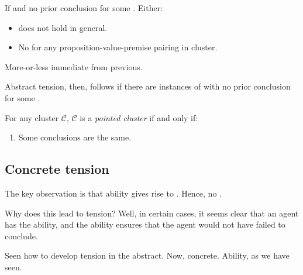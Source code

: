 \begin{note}
  \begin{proposition}
    If \ragCluster{} and no prior conclusion for some \jag{}.
    Either:
    \begin{itemize}
    \item
      \ESU{} does not hold in general.
    \item
      No \csVImp{} for any proposition-value-premise pairing in cluster.
    \end{itemize}
      \begin{argument}
    More-or-less immediate from previous.
  \end{argument}
  \end{proposition}
\end{note}

\begin{note}
  Abstract tension, then, follows if there are instances of  with no prior conclusion for some \jag{}.
\end{note}

\begin{note}
    \begin{definition}
    For any cluster \(\mathcal{C}\), \(\mathcal{C}\) is a \emph{pointed cluster} if and only if:
    \begin{enumerate}
    \item
      Some conclusions are the same.
    \end{enumerate}
    \vspace{-\baselineskip}
  \end{definition}
\end{note}

\subsection{Concrete tension}
\label{sec:concrete-tension}

\begin{note}
  \color{red}
  The key observation is that ability gives rise to .
  Hence, no \csN{}.

  Why does this lead to tension?
  Well, in certain cases, it seems clear that an agent has the ability, and the ability ensures that the agent would not have failed to conclude.
\end{note}

\begin{note}
  Seen how to develop tension in the abstract.
  Now, concrete.
  Ability, as we have seen.
\end{note}

